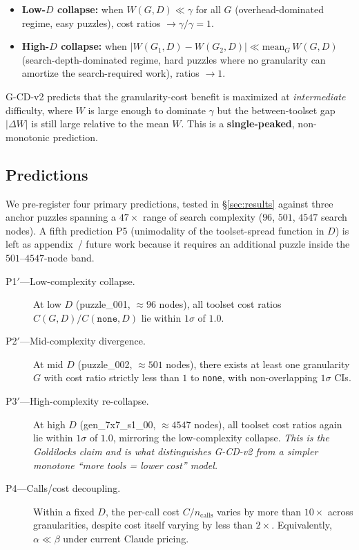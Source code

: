 \documentclass[11pt,letterpaper]{article}
\begin{document}
\begin{itemize}
  \item \textbf{Low-$D$ collapse:} when $W(G, D) \ll \gamma$ for all
    $G$ (overhead-dominated regime, easy puzzles), cost ratios
    $\to \gamma / \gamma = 1$.
  \item \textbf{High-$D$ collapse:} when
    $|W(G_1, D) - W(G_2, D)| \ll \mathrm{mean}_G\, W(G, D)$
    (search-depth-dominated regime, hard puzzles where no
    granularity can amortize the search-required work), ratios
    $\to 1$.
\end{itemize}

G-CD-v2 predicts that the granularity-cost benefit is maximized at
\emph{intermediate} difficulty, where $W$ is large enough to
dominate $\gamma$ but the between-toolset gap $|\Delta W|$ is still
large relative to the mean $W$. This is a \textbf{single-peaked},
non-monotonic prediction.

\subsection*{Predictions}

We pre-register four primary predictions, tested in
\S\ref{sec:results} against three anchor puzzles spanning a
$47\times$ range of search complexity ($96$, $501$, $4547$
search nodes). A fifth prediction \textsc{P5} (unimodality of the
toolset-spread function in $D$) is left as appendix~/ future work
because it requires an additional puzzle inside the
$501$--$4547$-node band.

\begin{description}
  \item[\textsc{P1$'$}---Low-complexity collapse.]
    At low $D$ (puzzle\_001, ${\approx}96$ nodes), all toolset cost
    ratios $C(G, D) / C(\texttt{none}, D)$ lie within $1\sigma$ of
    $1.0$.
  \item[\textsc{P2$'$}---Mid-complexity divergence.]
    At mid $D$ (puzzle\_002, ${\approx}501$ nodes), there exists at
    least one granularity $G$ with cost ratio strictly less than
    $1$ to \texttt{none}, with non-overlapping $1\sigma$ CIs.
  \item[\textsc{P3$'$}---High-complexity re-collapse.]
    At high $D$ (gen\_7x7\_s1\_00, ${\approx}4547$ nodes), all
    toolset cost ratios again lie within $1\sigma$ of $1.0$,
    mirroring the low-complexity collapse. \emph{This is the
    Goldilocks claim and is what distinguishes G-CD-v2 from a
    simpler monotone ``more tools = lower cost'' model.}
  \item[\textsc{P4}---Calls/cost decoupling.]
    Within a fixed $D$, the per-call cost
    $C / n_{\text{calls}}$ varies by more than $10\times$ across
    granularities, despite cost itself varying by less than
    $2\times$. Equivalently, $\alpha \ll \beta$ under current
    Claude pricing.
\end{description}
\end{document}
